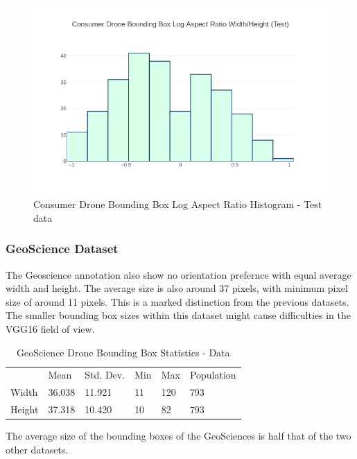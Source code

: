 \documentclass{IEEEtran}
\begin{document}
\begin{figure}[H]
\centering
\label{consumerdronetestaspect}
\includegraphics[scale=0.4]{images/test-aspect.png}
\caption{Consumer Drone Bounding Box Log Aspect Ratio Histogram - Test data}
\end{figure}


\subsubsection{GeoScience Dataset}

The Geoscience annotation also show no orientation prefernce with equal average width and height. The average size is also around 37 pixels, with minimum pixel size of around 11 pixels. This is a marked distinction from the previous datasets. The smaller bounding box sizes within this dataset might cause difficulties in the VGG16 field of view.

\begin{table}[ht]
\caption{GeoScience Drone Bounding Box Statistics - Data}
\centering
\begin{tabular}{llllll}
       & Mean   & Std. Dev. & Min & Max & Population\\
Width  & 36.038 & 11.921 & 11 & 120 & 793 \\
Height & 37.318 & 10.420 & 10 & 82 & 793
\end{tabular}
\end{table}

The average size of the bounding boxes of the GeoSciences is half that of the two other datasets. 
\end{document}
